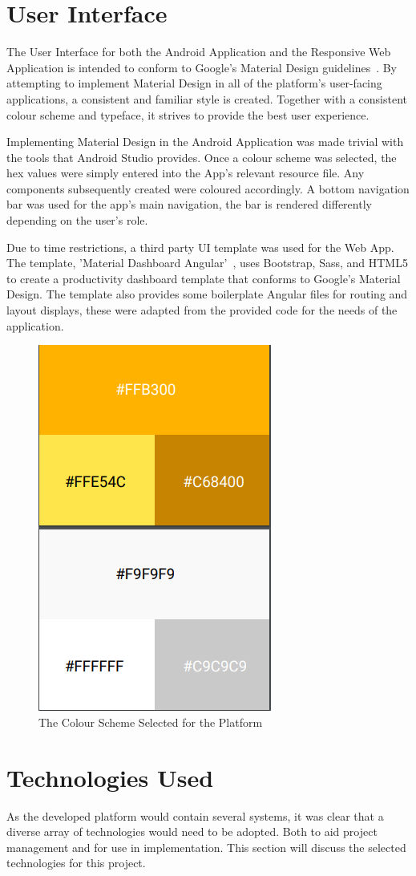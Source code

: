 \section{User Interface}
The User Interface for both the Android Application and the Responsive Web Application is intended to conform to Google's Material Design guidelines~\cite{material_documentation_ref}. By attempting to implement Material Design in all of the platform's user-facing applications, a consistent and familiar style is created. Together with a consistent colour scheme and typeface, it strives to provide the best user experience.

Implementing Material Design in the Android Application was made trivial with the tools that Android Studio provides. Once a colour scheme was selected, the hex values were simply entered into the App's relevant resource file. Any components subsequently created were coloured accordingly. A bottom navigation bar was used for the app's main navigation, the bar is rendered differently depending on the user's role.

Due to time restrictions, a third party UI template was used for the Web App. The template, 'Material Dashboard Angular'~\cite{angular_material_documentation_ref}, uses Bootstrap, Sass, and HTML5 to create a productivity dashboard template that conforms to Google's Material Design. The template also provides some boilerplate Angular files for routing and layout displays, these were adapted from the provided code for the needs of the application.

\begin{figure}[!htb]
	\centering
	\includegraphics[width=0.25\linewidth]{Resources/img/color-scheme.png}
	\caption{The Colour Scheme Selected for the Platform}
	\label{fig:color-scheme}
\end{figure}

\section{Technologies Used}
As the developed platform would contain several systems, it was clear that a diverse array of technologies would need to be adopted. Both to aid project management and for use in implementation. This section will discuss the selected technologies for this project.


